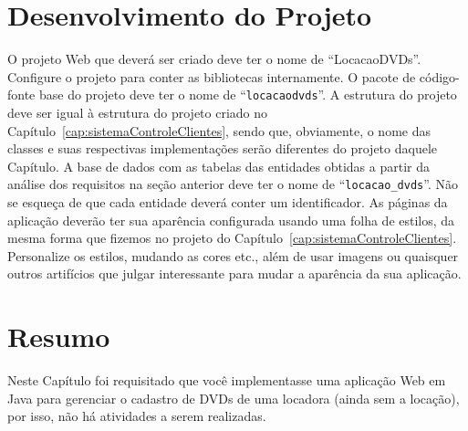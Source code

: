 \section{Desenvolvimento do Projeto}

O projeto Web que deverá ser criado deve ter o nome de ``LocacaoDVDs''. Configure o projeto para conter as bibliotecas internamente. O pacote de código-fonte base do projeto deve ter o nome de ``\texttt{locacaodvds}''. A estrutura do projeto deve ser igual à estrutura do projeto criado no Capítulo~\ref{cap:sistemaControleClientes}, sendo que, obviamente, o nome das classes e suas respectivas implementações serão diferentes do projeto daquele Capítulo. A base de dados com as tabelas das entidades obtidas a partir da análise dos requisitos na seção anterior deve ter o nome de ``\texttt{locacao\_dvds}''. Não se esqueça de que cada entidade deverá conter um identificador. As páginas da aplicação deverão ter sua aparência configurada usando uma folha de estilos, da mesma forma que fizemos no projeto do Capítulo~\ref{cap:sistemaControleClientes}. Personalize os estilos, mudando as cores etc., além de usar imagens ou quaisquer outros artifícios que julgar interessante para mudar a aparência da sua aplicação.


\section{Resumo}

Neste Capítulo foi requisitado que você implementasse uma aplicação Web em Java para gerenciar o cadastro de DVDs de uma locadora (ainda sem a locação), por isso, não há atividades a serem realizadas.
